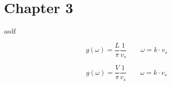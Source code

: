\section{Chapter 3}
asdf

\begin{equation}
    g(\omega) = \frac{L}{\pi} \frac{1}{v_s} \qquad \omega = k \cdot v_s 
\end{equation}


\begin{equation}
    g(\omega) = \frac{V}{\pi} \frac{1}{v_s} \qquad \omega = k \cdot v_s 
\end{equation}